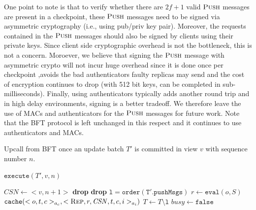 \documentclass[twocolumn,10pt]{article}
\begin{document}
{One point to note is that to verify whether there are $2f+1$ valid $\textsc{Push}$
messages are present in a checkpoint, these $\textsc{Push}$ messages need to be 
signed via asymmetric cryptography (i.e., using pub/priv key pair). Moreover, the
requests contained in the $\textsc{Push}$ messages should also be signed by clients
using their private keys. Since client side cryptographic overhead is not the 
bottleneck, this is not a concern. Moroever, we believe that signing the $\textsc{Push}$ message
with asymmetric crypto will not incur huge overhead since it is done once per checkpoint
,avoids the bad authenticators faulty replicas may send and the cost of encryption continues
to drop (with 512 bit keys, can be completed in sub-milliseconds). Finally, using authenticators
typically adds another round trip and in high delay environments, signing is a better tradeoff.
We therefore leave the
use of MACs and authenticators for the $\textsc{Push}$ messages for future work. Note that
the BFT protocol is left unchanged in this respect and it continues to use authenticators and MACs.
\begin{algorithm}
\small
\caption{Upcall from BFT once an update batch $T'$ is committed in view
  $v$ with sequence number $n$.}
$\mathtt{execute}(T', v, n)$
\begin{algorithmic}[1]\label{alg:execute}
\STATE $\mathit{CSN} \leftarrow <v, n + 1>$
    \label{lin:checkQuorumPush}
\STATE \textbf{drop}
\ENDIF
\IF [[Proposed batch violates error bounds.]
       {$(|F(T'_+)| > \alpha) \vee (|F(T'_-)| > \alpha)$}
        \label{lin:maxPrePrepareBatchWeight}
        \STATE \textbf{drop}
\ENDIF
\STATE $\mathtt{l = order(T'.pushMsgs)}$ 
\label{lin:constructOrdering}
\STATE $r \leftarrow \mathtt{eval}(o, S)$ 
  \label{lin:evaluateCommitted}
\STATE $\mathtt{cache}(<o, t, c>_{a_c}, <\textsc{Rep}, r, \mathit{CSN}, t, c,
    i>_{a_i})$ 
\ENDFOR
\STATE $T \leftarrow T \setminus \mathtt{l}$ 
\STATE $\mathit{busy} \leftarrow \mathtt{false}$
\end{algorithmic}
\end{algorithm}



}
\end{document}
